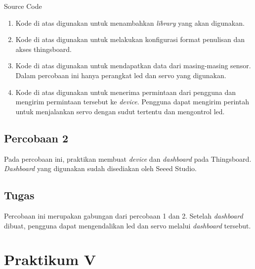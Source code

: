 \documentclass{class}
\begin{document}
  Source Code
    \begin{enumerate}
      \item 
      Kode di atas digunakan untuk menambahkan \emph{library} yang akan digunakan. \\
      \item 
      Kode di atas digunakan untuk melakukan konfigurasi format penulisan dan akses thingsboard. \\
      \item 
      Kode di atas digunakan untuk mendapatkan data dari masing-masing sensor.
      Dalam percobaan ini hanya perangkat led dan servo yang digunakan. \\
      \item 
      Kode di atas digunakan untuk menerima permintaan dari pengguna dan mengirim permintaan tersebut ke \emph{device}.
      Pengguna dapat mengirim perintah untuk menjalankan servo dengan sudut tertentu dan mengontrol led. \\
    \end{enumerate}
  \subsection{Percobaan 2}
  Pada percobaan ini, praktikan membuat \emph{device} dan \emph{dashboard} pada Thingsboard.
  \emph{Dashboard} yang digunakan sudah disediakan oleh Seeed Studio.
  \subsection{Tugas}
  Percobaan ini merupakan gabungan dari percobaan 1 dan 2.
  Setelah \emph{dashboard} dibuat, pengguna dapat mengendalikan led dan servo melalui \emph{dashboard} tersebut.

  \section{Praktikum V}
\end{document}
